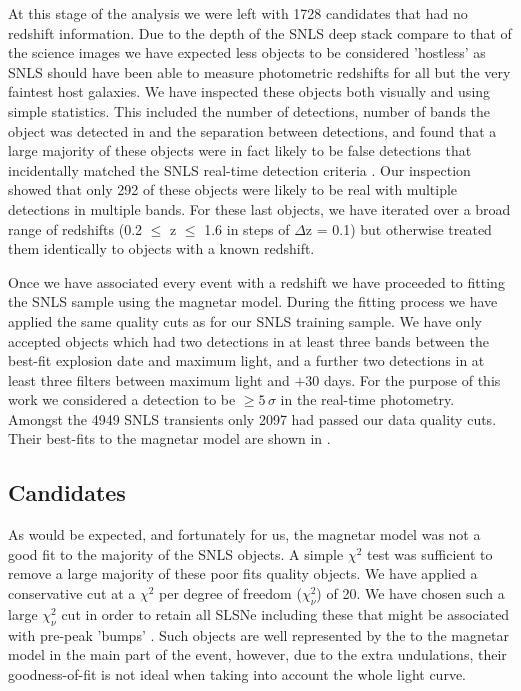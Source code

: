 At this stage of the analysis we were left with 1728 candidates that had no redshift information. Due to the depth of the SNLS deep stack compare to that of the science images we have expected less objects to be considered 'hostless' as SNLS should have been able to measure photometric redshifts for all but the very faintest host galaxies. We have inspected these objects both visually and using simple statistics. This included the number of detections, number of bands the object was detected in and the separation between detections, and found that a large majority of these objects were in fact likely to be false detections that incidentally matched the SNLS real-time detection criteria \citep{Perrett2010}. Our inspection showed that only 292 of these objects were likely to be real with multiple detections in multiple bands. For these last objects, we have iterated over a broad range of redshifts (0.2 $\leq$ z $\leq$ 1.6 in steps of $\Delta$z = 0.1) but otherwise treated them identically to objects with a known redshift.

Once we have associated every event with a redshift we have proceeded to fitting the SNLS sample using the magnetar model. During the fitting process we have applied the same quality cuts as for our SNLS training sample. We have only accepted objects which had two detections in at least three bands between the best-fit explosion date and maximum light, and a further two detections in at least three filters between maximum light and $+30$ days. For the purpose of this work we considered a detection to be $\geq5$\,$\sigma$ in the real-time photometry. Amongst the 4949 SNLS transients only 2097 had passed our data quality cuts. Their best-fits to the magnetar model are shown in .

\subsection{Candidates}
As would be expected, and fortunately for us, the magnetar model was not a good fit to the majority of the SNLS objects. A simple $\chi^2$ test was sufficient to remove a large majority of these poor fits quality objects. We have applied a conservative cut at a $\chi^2$ per degree of freedom ($\chi^2_{\nu}$) of 20. We have chosen such a large $\chi^2_{\nu}$ cut in order to retain all SLSNe including these that might be associated with pre-peak 'bumps' \citep{2015ApJ...807L..18N,2015arXiv151103740N,2016ApJ...818L...8S}. Such objects are well represented by the to the magnetar model in the main part of the event, however, due to the extra undulations, their goodness-of-fit is not ideal when taking into account the whole light curve.

